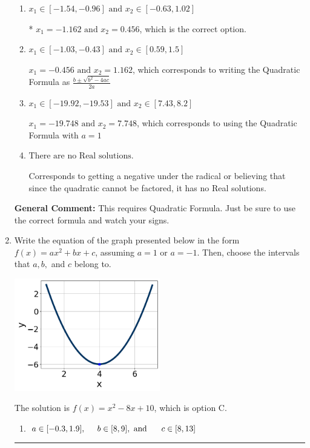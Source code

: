 \documentclass{extbook}[14pt]
\newcommand{\litem}[1]{\item #1

\rule{\textwidth}{0.4pt}}
\begin{document}
\begin{enumerate}
{\begin{enumerate}[label=\Alph*.]
 $x_1 = -27.848 \text{ and } x_2 = 27.143$, which corresponds to writing the Quadratic Formula as $-\frac{b}{2a} \pm \sqrt{b^2 - 4ac}$.
\item \( x_1 \in [-1.54, -0.96] \text{ and } x_2 \in [-0.63, 1.02] \)

* $x_1 = -1.162 \text{ and } x_2 = 0.456$, which is the correct option.
\item \( x_1 \in [-1.03, -0.43] \text{ and } x_2 \in [0.59, 1.5] \)

 $x_1 = -0.456 \text{ and } x_2 = 1.162$, which corresponds to writing the Quadratic Formula as $\frac{b \pm \sqrt{b^2 - 4ac}}{2a}$
\item \( x_1 \in [-19.92, -19.53] \text{ and } x_2 \in [7.43, 8.2] \)

 $x_1 = -19.748 \text{ and } x_2 = 7.748$, which corresponds to using the Quadratic Formula with $a=1$
\item \( \text{There are no Real solutions.} \)

Corresponds to getting a negative under the radical or believing that since the quadratic cannot be factored, it has no Real solutions.
\end{enumerate}

\textbf{General Comment:} This requires Quadratic Formula. Just be sure to use the correct formula and watch your signs.
}
\litem{
Write the equation of the graph presented below in the form $f(x)=ax^2+bx+c$, assuming  $a=1$ or $a=-1$. Then, choose the intervals that $a, b,$ and $c$ belong to.

\begin{center}
    \includegraphics[width=0.5\textwidth]{../Figures/quadraticGraphToEquationA.png}
\end{center}



The solution is \( f(x) = x^{2} -8 x + 10 \), which is option C.\begin{enumerate}[label=\Alph*.]
\item \( a \in [-0.3, 1.9], \hspace*{5mm} b \in [8, 9], \text{ and } \hspace*{5mm} c \in [8, 13] \)


\end{enumerate}}
\end{enumerate}
\end{document}
